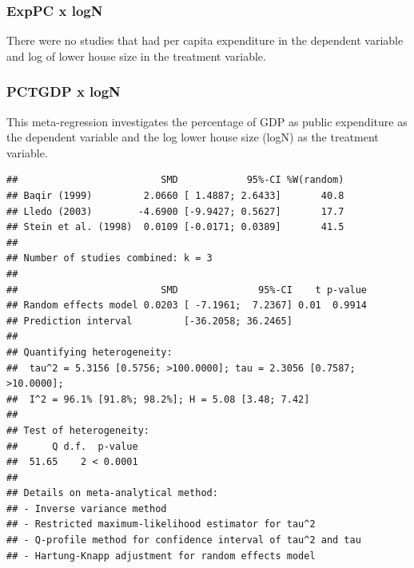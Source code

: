 \documentclass[
]{article}
\newenvironment{Shaded}{\begin{snugshade}}{\end{snugshade}}
\newcommand{\CommentTok}[1]{\textcolor[rgb]{0.56,0.35,0.01}{\textit{#1}}}
\newcommand{\DataTypeTok}[1]{\textcolor[rgb]{0.13,0.29,0.53}{#1}}
\newcommand{\KeywordTok}[1]{\textcolor[rgb]{0.13,0.29,0.53}{\textbf{#1}}}
\newcommand{\NormalTok}[1]{#1}
\newcommand{\OperatorTok}[1]{\textcolor[rgb]{0.81,0.36,0.00}{\textbf{#1}}}
\newcommand{\OtherTok}[1]{\textcolor[rgb]{0.56,0.35,0.01}{#1}}
\newcommand{\StringTok}[1]{\textcolor[rgb]{0.31,0.60,0.02}{#1}}
\begin{document}
\newpage

\hypertarget{exppc-x-logn}{%
\subsubsection{ExpPC x logN}\label{exppc-x-logn}}

There were no studies that had per capita expenditure in the dependent
variable and log of lower house size in the treatment variable.

\hypertarget{pctgdp-x-logn}{%
\subsubsection{PCTGDP x logN}\label{pctgdp-x-logn}}

This meta-regression investigates the percentage of GDP as public
expenditure as the dependent variable and the log lower house size
(logN) as the treatment variable.

\begin{Shaded}
\end{Shaded}

\begin{verbatim}
##                         SMD            95%-CI %W(random)
## Baqir (1999)         2.0660 [ 1.4887; 2.6433]       40.8
## Lledo (2003)        -4.6900 [-9.9427; 0.5627]       17.7
## Stein et al. (1998)  0.0109 [-0.0171; 0.0389]       41.5
## 
## Number of studies combined: k = 3
## 
##                         SMD              95%-CI    t p-value
## Random effects model 0.0203 [ -7.1961;  7.2367] 0.01  0.9914
## Prediction interval         [-36.2058; 36.2465]             
## 
## Quantifying heterogeneity:
##  tau^2 = 5.3156 [0.5756; >100.0000]; tau = 2.3056 [0.7587; >10.0000];
##  I^2 = 96.1% [91.8%; 98.2%]; H = 5.08 [3.48; 7.42]
## 
## Test of heterogeneity:
##      Q d.f.  p-value
##  51.65    2 < 0.0001
## 
## Details on meta-analytical method:
## - Inverse variance method
## - Restricted maximum-likelihood estimator for tau^2
## - Q-profile method for confidence interval of tau^2 and tau
## - Hartung-Knapp adjustment for random effects model
\end{verbatim}
\end{document}
